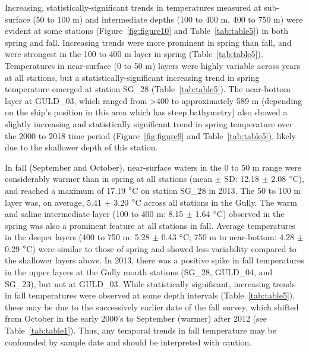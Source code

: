 \documentclass[12pt]{article}\usepackage[]{graphicx}\usepackage[]{color}
\begin{document}
Increasing, statistically-significant trends in temperatures measured at sub-surface (50 to 100 m) and intermediate depths (100 to 400 m, 400 to 750 m) were evident at some stations (Figure~\ref{fig:figure10} and Table~\ref{tab:table5}) in both spring and fall. Increasing trends were more prominent in spring than fall, and were strongest in the 100 to 400 m layer in spring (Table~\ref{tab:table5}). Temperatures in near-surface (0 to 50 m) layers were highly variable across years at all stations, but a statistically-significant increasing trend in spring temperature emerged at station SG\_28 (Table~\ref{tab:table5}). The near-bottom layer at GULD\_03, which ranged from \textgreater400 to approximately 589 m (depending on the ship's position in this area which has steep bathymetry) also showed a slightly increasing and statistically significant trend in spring temperature over the 2000 to 2018 time period (Figure~\ref{fig:figure9} and Table~\ref{tab:table5}), likely due to the shallower depth of this station.

In fall (September and October), near-surface waters in the 0 to 50 m range were considerably warmer than in spring at all stations (mean \(\pm\) SD: 12.18 \(\pm\) 2.08 \(\degree\)C), and reached a maximum of 17.19 \(\degree\)C on station SG\_28 in 2013. The 50 to 100 m layer was, on average, 5.41 \(\pm\) 3.20 \(\degree\)C across all stations in the Gully. The warm and saline intermediate layer (100 to 400 m: 8.15 \(\pm\) 1.64 \(\degree\)C) observed in the spring was also a prominent feature at all stations in fall. Average temperatures in the deeper layers (400 to 750 m: 5.28 \(\pm\) 0.43 \(\degree\)C; 750 m to near-bottom: 4.28 \(\pm\) 0.29 \(\degree\)C) were similar to those of spring and showed less variability compared to the shallower layers above. In 2013, there was a positive spike in fall temperatures in the upper layers at the Gully mouth stations (SG\_28, GULD\_04, and SG\_23), but not at GULD\_03. While statistically significant, increasing trends in fall temperatures were observed at some depth intervals (Table~\ref{tab:table5}), these may be due to the successively earlier date of the fall survey, which shifted from October in the early 2000's to September (warmer) after 2012 (see Table~\ref{tab:table1}). Thus, any temporal trends in fall temperature may be confounded by sample date and should be interpreted with caution.
\end{document}
